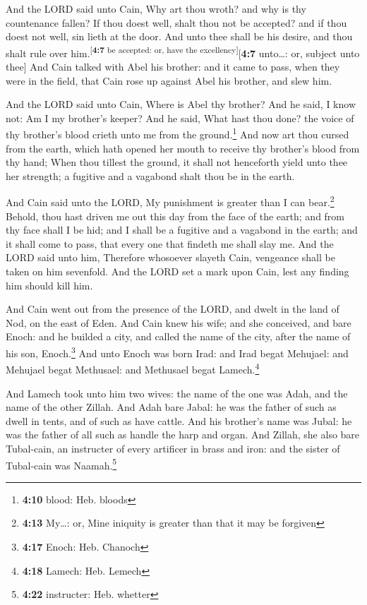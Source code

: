  And the LORD said unto Cain, Why art thou wroth? and why
is thy countenance fallen?  If thou doest well, shalt thou
not be accepted? and if thou doest not well, sin lieth at the door. And
unto thee shall be his desire, and thou shalt rule over
him.\textsuperscript{{[}\textbf{4:7} be accepted: or, have the
excellency{]}}{[}\textbf{4:7} unto\ldots: or, subject unto thee{]}
 And Cain talked with Abel his brother: and it came to
pass, when they were in the field, that Cain rose up against Abel his
brother, and slew him.

 And the LORD said unto Cain, Where is Abel thy brother?
And he said, I know not: Am I my brother's keeper?  And
he said, What hast thou done? the voice of thy brother's blood crieth
unto me from the ground.\footnote{\textbf{4:10} blood: Heb. bloods}
 And now art thou cursed from the earth, which hath
opened her mouth to receive thy brother's blood from thy hand;
 When thou tillest the ground, it shall not henceforth
yield unto thee her strength; a fugitive and a vagabond shalt thou be in
the earth.

 And Cain said unto the LORD, My punishment is greater
than I can bear.\footnote{\textbf{4:13} My\ldots: or, Mine iniquity is
  greater than that it may be forgiven}  Behold, thou
hast driven me out this day from the face of the earth; and from thy
face shall I be hid; and I shall be a fugitive and a vagabond in the
earth; and it shall come to pass, that every one that findeth me shall
slay me.  And the LORD said unto him, Therefore whosoever
slayeth Cain, vengeance shall be taken on him sevenfold. And the LORD
set a mark upon Cain, lest any finding him should kill him.

 And Cain went out from the presence of the LORD, and
dwelt in the land of Nod, on the east of Eden.  And Cain
knew his wife; and she conceived, and bare Enoch: and he builded a city,
and called the name of the city, after the name of his son,
Enoch.\footnote{\textbf{4:17} Enoch: Heb. Chanoch}  And
unto Enoch was born Irad: and Irad begat Mehujael: and Mehujael begat
Methusael: and Methusael begat Lamech.\footnote{\textbf{4:18} Lamech:
  Heb. Lemech}

 And Lamech took unto him two wives: the name of the one
was Adah, and the name of the other Zillah.  And Adah
bare Jabal: he was the father of such as dwell in tents, and of such as
have cattle.  And his brother's name was Jubal: he was
the father of all such as handle the harp and organ.  And
Zillah, she also bare Tubal-cain, an instructer of every artificer in
brass and iron: and the sister of Tubal-cain was Naamah.\footnote{\textbf{4:22}
  instructer: Heb. whetter}

